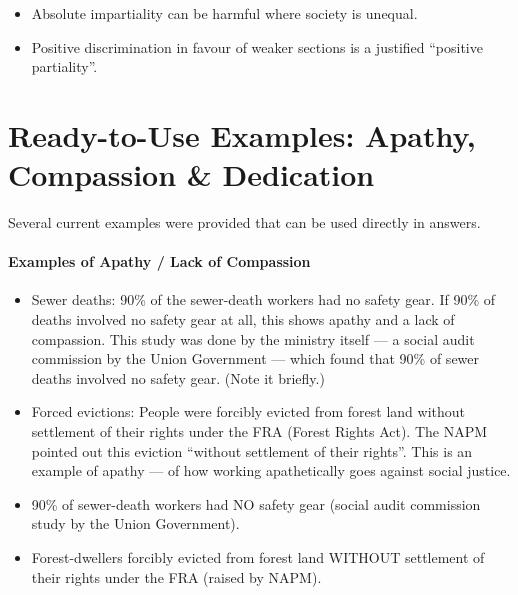 \begin{CriticalPoint}
\begin{itemize}
\item Absolute impartiality can be harmful where society is unequal.
\item Positive discrimination in favour of weaker sections is a justified ``positive partiality''.
\end{itemize}
\end{CriticalPoint}

\section{Ready-to-Use Examples: Apathy, Compassion \& Dedication}

Several current examples were provided that can be used directly in answers.

\paragraph{Examples of Apathy / Lack of Compassion}

\begin{itemize}
\item Sewer deaths: 90\% of the sewer-death workers had no safety gear. If 90\% of deaths involved no safety gear at all, this shows apathy and a lack of compassion. This study was done by the ministry itself --- a social audit commission by the Union Government --- which found that 90\% of sewer deaths involved no safety gear. (Note it briefly.)
\item Forced evictions: People were forcibly evicted from forest land without settlement of their rights under the FRA (Forest Rights Act). The NAPM pointed out this eviction ``without settlement of their rights''. This is an example of apathy --- of how working apathetically goes against social justice.
\end{itemize}

\begin{DataFact}
\begin{itemize}
\item 90\% of sewer-death workers had NO safety gear (social audit commission study by the Union Government).
\item Forest-dwellers forcibly evicted from forest land WITHOUT settlement of their rights under the FRA (raised by NAPM).
\end{itemize}
\end{DataFact}

